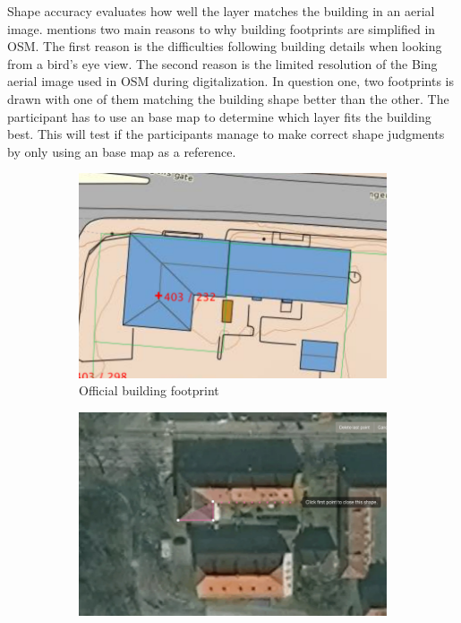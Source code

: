 Shape accuracy evaluates how well the layer matches the building in an aerial image. \cite{Fan2014} mentions two main reasons to why building footprints are simplified in OSM. The first reason is the difficulties following building details when looking from a bird's eye view. The second reason is the limited resolution of the Bing aerial image used in OSM during digitalization. In question one, two footprints is drawn with one of them matching the building shape better than the other. The participant has to use an base map to determine which layer fits the building best. This will test if the participants manage to make correct shape judgments by only using an base map as a reference. 

\begin{figure}[H]
	\centering
	\begin{subfigure}[b]{0.32\textwidth}
		\centering
		\includegraphics[width=\linewidth]{fig/build1}
		\caption{Official building footprint}
		\label{fig:build1}
	\end{subfigure}
	\begin{subfigure}[b]{0.32\textwidth}
		\centering
		\includegraphics[width=\linewidth]{fig/build2}

\end{subfigure}
\end{figure}
